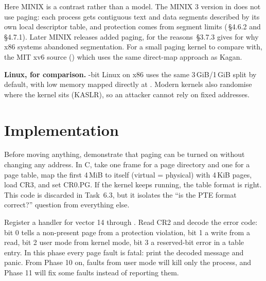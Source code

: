 \documentclass[11pt,a4paper]{article}
\begin{document}
\begin{minixbox}
Here MINIX is a contrast rather than a model. The MINIX 3 version in \OSDI does not use paging: each process gets
contiguous text and data segments described by its own local descriptor table, and protection comes from segment
limits (\OSDI\,\S4.6.2 and \S4.7.1). Later MINIX releases added paging, for the reasons \MOS\,\S3.7.3 gives for
why x86 systems abandoned segmentation. For a small paging kernel to compare with, the MIT xv6
source () which uses the same direct-map approach as Kagan.

\par\smallskip\textbf{Linux, for comparison.} -bit Linux on x86 uses the same 3\,GiB/1\,GiB split by default, with low memory mapped directly at . Modern kernels also randomise where the kernel sits (KASLR), so an attacker cannot rely on fixed addresses.
\end{minixbox}

\section{Implementation}

Before moving anything, demonstrate that paging can be turned on without changing any address. In C, take one frame for a page
directory and one for a page table, map the first 4\,MiB to itself (virtual = physical) with 4\,KiB pages, load CR3,
and set CR0.PG. If the kernel keeps running, the table format is right. This code is discarded in Task~6.3,
but it isolates the ``is the PTE format correct?'' question from everything else.


Register a handler for vector 14 through . Read CR2 and decode the error code:
bit 0 tells a non-present page from a protection violation, bit 1 a write from a read, bit 2 user mode from kernel
mode, bit 3 a reserved-bit error in a table entry. In this phase every page fault is fatal: print the decoded message and
panic. From Phase 10 on, faults from user mode will kill only the process, and Phase 11 will fix some faults instead
of reporting them.
\end{document}
